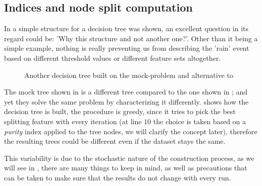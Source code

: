 \subsection{Indices and node split computation}
In  a simple structure for a decision tree was shown, an excellent question in
its regard could be: 'Why this structure and not another one?'. Other than it being a simple
example, nothing is really preventing us from describing the 'rain' event based on different threshold values or different feature sets altogether.
\begin{figure}
	\centering
	\caption{Another decision tree built on the mock-problem and alternative to
		}
	\label{fig:simple-dt-alt}
\end{figure}
The mock tree shown in  is a different tree compared to the one shown in
; and yet they solve the same problem by characterizing it differently.
 shows how the decision tree is built, the procedure is greedy, since it
tries to pick the best splitting feature with every iteration (at line $10$ the choice is taken
based on a \emph{purity} index applied to the tree nodes, we will clarify the concept later), therefore the resulting trees could be different even if the dataset stays the same.

This variability is due to the stochastic nature of the construction process, as we will see in
, there are many things to keep in mind, as well as precautions that can be taken
to make sure that the results do not change with every run.

